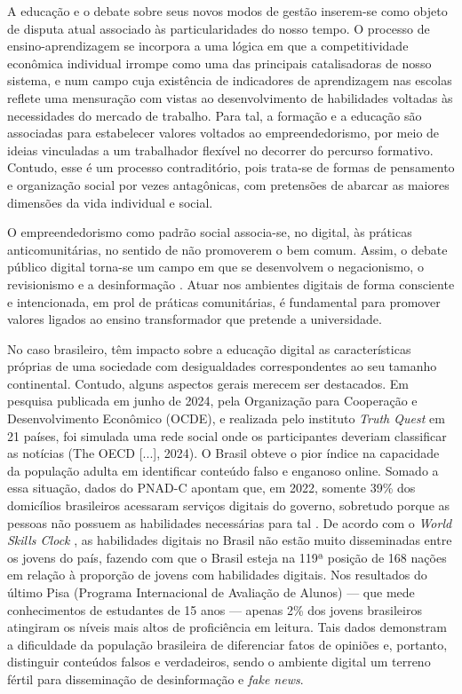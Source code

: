 \documentclass[portuguese]{textolivre}
\begin{document}
A educação e o debate sobre seus novos modos de gestão inserem-se como
objeto de disputa atual associado às particularidades do nosso tempo. O
processo de ensino-aprendizagem se incorpora a uma lógica em que a
competitividade econômica individual irrompe como uma das principais
catalisadoras de nosso sistema, e num campo cuja existência de
indicadores de aprendizagem nas escolas reflete uma mensuração com
vistas ao desenvolvimento de habilidades voltadas às necessidades do
mercado de trabalho. Para tal, a formação e a educação são associadas
para estabelecer valores voltados ao empreendedorismo, por meio de
ideias vinculadas a um trabalhador flexível no decorrer do percurso
formativo. Contudo, esse é um processo contraditório, pois trata-se de
formas de pensamento e organização social por vezes antagônicas, com
pretensões de abarcar as maiores dimensões da vida individual e social.

O empreendedorismo como padrão social associa-se, no digital, às
práticas anticomunitárias, no sentido de não promoverem o bem comum.
Assim, o debate público digital torna-se um campo em que se desenvolvem
o negacionismo, o revisionismo e a desinformação
\cite{Anthonysamy2022, Ciampaglia2018}. Atuar nos ambientes digitais de
forma consciente e intencionada, em prol de práticas comunitárias, é
fundamental para promover valores ligados ao ensino transformador que
pretende a universidade.

No caso brasileiro, têm impacto sobre a educação digital as
características próprias de uma sociedade com desigualdades
correspondentes ao seu tamanho continental. Contudo, alguns aspectos
gerais merecem ser destacados. Em pesquisa publicada em junho de 2024,
pela Organização para Cooperação e Desenvolvimento Econômico (OCDE), e
realizada pelo instituto \emph{Truth Quest} em 21 países, foi simulada
uma rede social onde os participantes deveriam classificar as notícias
(The OECD {[}...{]}, 2024). O Brasil obteve o pior índice na capacidade
da população adulta em identificar conteúdo falso e enganoso online.
Somado a essa situação, dados do PNAD-C apontam que, em 2022, somente
39\% dos domicílios brasileiros acessaram serviços digitais do governo,
sobretudo porque as pessoas não possuem as habilidades necessárias para
tal \cite{Mahdi2024}. De acordo com o \emph{World Skills Clock}
\cite{ONU2024}, as habilidades digitais no Brasil não estão muito
disseminadas entre os jovens do país, fazendo com que o Brasil esteja na
119ª posição de 168 nações em relação à proporção de jovens com
habilidades digitais. Nos resultados do último Pisa (Programa
Internacional de Avaliação de Alunos) --- que mede conhecimentos de
estudantes de 15 anos --- apenas 2\% dos jovens brasileiros atingiram os
níveis mais altos de proficiência em leitura. Tais dados demonstram a
dificuldade da população brasileira de diferenciar fatos de opiniões e,
portanto, distinguir conteúdos falsos e verdadeiros, sendo o ambiente
digital um terreno fértil para disseminação de desinformação e
\emph{fake news}.
\end{document}
